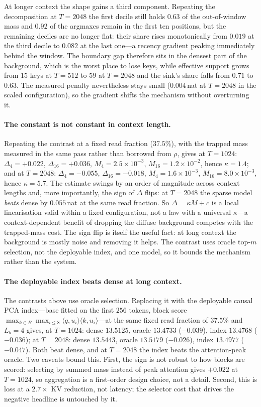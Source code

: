 \documentclass[sigconf,nonacm,11pt]{acmart}
\begin{document}
At longer context the shape gains a third component. Repeating the decomposition at
$T=2048$ the first decile still holds $0.63$ of the out-of-window mass and $0.92$ of
the argmaxes remain in the first ten positions, but the remaining deciles are no
longer flat: their share rises monotonically from $0.019$ at the third decile to
$0.082$ at the last one---a recency gradient peaking immediately behind the window.
The boundary gap therefore sits in the densest part of the background, which is the
worst place to lose keys, while effective support grows from $15$ keys at $T=512$ to
$59$ at $T=2048$ and the sink's share falls from $0.71$ to $0.63$. The measured
penalty nevertheless stays small ($0.004$\,nat at $T=2048$ in the scaled
configuration), so the gradient shifts the mechanism without overturning it.

\paragraph{The constant is not constant in context length.} Repeating the contrast at
a fixed read fraction ($37.5\%$), with the trapped mass measured in the same pass
rather than borrowed from $\rho$, gives at $T=1024$: $\Delta_4=+0.022$,
$\Delta_{16}=+0.036$, $M_4=2.5\times10^{-3}$, $M_{16}=1.2\times10^{-2}$, hence
$\kappa=1.4$; and at $T=2048$: $\Delta_4=-0.055$, $\Delta_{16}=-0.018$,
$M_4=1.6\times10^{-3}$, $M_{16}=8.0\times10^{-3}$, hence $\kappa=5.7$. The estimate
swings by an order of magnitude across context lengths and, more importantly, the
sign of $\Delta$ flips: at $T=2048$ the sparse model \emph{beats} dense by
$0.055$\,nat at the same read fraction. So $\Delta=\kappa M+c$ is a local
linearisation valid within a fixed configuration, not a law with a universal
$\kappa$---a context-dependent benefit of dropping the diffuse background competes
with the trapped-mass cost. The sign flip is itself the useful fact: at long context
the background is mostly noise and removing it helps. The contrast uses oracle
top-$m$ selection, not the deployable index, and one model, so it bounds the
mechanism rather than the system.

\paragraph{The deployable index beats dense at long context.} The contrasts above use
oracle selection. Replacing it with the deployable causal PCA index---base fitted on
the first $256$ tokens, block score
$\max_{k\in B}\max_{i\le 8}\langle q,u_i\rangle\langle k,u_i\rangle$---at the same
fixed read fraction of $37.5\%$ and $L_b=4$ gives, at $T=1024$: dense $13.5125$,
oracle $13.4733$ ($-0.039$), index $13.4768$ ($-0.036$); at $T=2048$: dense
$13.5443$, oracle $13.5179$ ($-0.026$), index $13.4977$ ($-0.047$). Both beat dense,
and at $T=2048$ the index beats the attention-peak oracle. Two caveats bound this.
First, the sign is not robust to how blocks are scored: selecting by summed mass
instead of peak attention gives $+0.022$ at $T=1024$, so aggregation is a first-order
design choice, not a detail. Second, this is loss at a $2.7\times$ KV reduction, not
latency; the selector cost that drives the negative headline is untouched by it.
\end{document}
